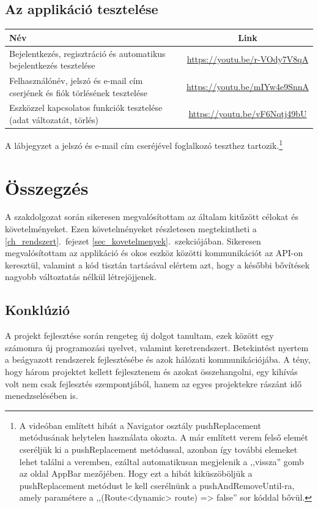\documentclass{thesis-ekf}
\theoremstyle{definition}
\theoremstyle{remark}
\begin{document}
	\section{Az applikáció tesztelése}
	\begin{table}[]
		\centering
		\begin{tabular}{|p{5cm}|c|}
			\hline
			\textbf{Név} & \multicolumn{1}{c|}{\textbf{Link}} \\ \hline
			Bejelentkezés, regisztráció és automatikus bejelentkezés tesztelése           & \multicolumn{1}{c|}{\url{https://youtu.be/r-VOdy7V8qA}}            \\ \hline
			Felhasználónév, jelszó és e-mail cím cserjének és fiók törlésének tesztelése           & \url{https://youtu.be/mIYw4e9SnnA}                                \\ \hline
			Eszközzel kapcsolatos funkciók tesztelése (adat változatát, törlés)           & \url{https://youtu.be/vF6Nqtj49bU}                                 \\ \hline
		\end{tabular}
	\end{table}
	A lábjegyzet a jelszó és e-mail cím cseréjével foglalkozó teszthez tartozik.\footnote{
		A videóban említett hibát a Navigator osztály pushReplacement metódusának helytelen használata okozta. A már említett verem felső elemét cseréljük ki a pushReplacement metódussal, azonban így további elemeket lehet találni a veremben, ezáltal automatikusan megjelenik a ,,vissza'' gomb az oldal AppBar mezőjében. Hogy ezt a hibát kiküszöböljük  a pushReplacement metódust le kell cserélnünk a pushAndRemoveUntil-ra, amely paramétere a ,,(Route<dynamic> route) => false'' sor kóddal bővül.} 
	\chapter*{Összegzés}
	A szakdolgozat során sikeresen megvalósítottam az általam kitűzött célokat és követelményeket. Ezen követelményeket részletesen megtekintheti a \ref{ch_rendszert}.~fejezet \ref{sec_kovetelmenyek}.~szekciójában. Sikeresen megvalósítottam az applikáció és okos eszköz közötti kommunikációt az API-on keresztül, valamint a kód tisztán tartásával elértem azt, hogy a későbbi bővítések nagyobb változtatás nélkül létrejöjjenek.
	\section*{Konklúzió}
	A projekt fejlesztése során rengeteg új dolgot tanultam, ezek között egy számomra új programozási nyelvet, valamint keretrendszert. Betekintést nyertem a beágyazott rendszerek fejlesztésébe és azok hálózati kommunikációjába. A tény, hogy három projektet kellett fejlesztenem és azokat összehangolni, egy kihívás volt nem csak fejlesztés szempontjából, hanem az egyes projektekre rászánt idő menedzselésében is.
	
\end{document}
